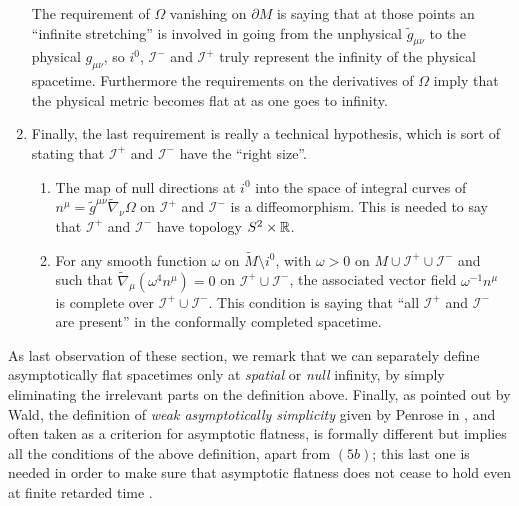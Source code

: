 \begin{definition}
\begin{enumerate}[label=(\arabic*)]
\begin{enumerate}
			\end{enumerate}
			The requirement of \(\Omega\) vanishing on \(\partial M\) is saying that at those points an ``infinite stretching'' is involved in going from the unphysical \(\tilde{g}_{\mu\nu}\) to the physical \(g_{\mu\nu}\), so \(i^0\), \(\mathscr{I}^-\) and \(\mathscr{I}^+\) truly represent the infinity of the physical spacetime. Furthermore the requirements on the derivatives of \(\Omega\) imply that the physical metric becomes flat at as one goes to infinity.
		\item Finally, the last requirement is really a technical hypothesis, which is sort of stating that \(\mathscr{I}^+\) and \(\mathscr{I}^-\) have the ``right size''.
		\begin{enumerate}
			\item The map of null directions at \(i^0\) into the space of integral curves of \(n^{\mu} = \tilde{g}^{\mu\nu} \tilde{\nabla}_{\nu}\Omega\) on  \(\mathscr{I}^+\) and \(\mathscr{I}^-\) is a diffeomorphism. This is needed to say that \(\mathscr{I}^+\) and \(\mathscr{I}^-\) have topology \(S^2\times{\mathbb{R}}\).
			\item For any smooth function \(\omega\) on \(\tilde{M} \setminus i^0\), with \(\omega > 0\) on \(M \cup \mathscr{I}^+ \cup \mathscr{I}^- \) and such that \(\tilde{\nabla}_{\mu}(\omega^4n^{\mu}) = 0\) on \(\mathscr{I}^+ \cup \mathscr{I}^-\), the associated vector field \(\omega^{-1}n^{\mu}\) is complete over \(\mathscr{I}^+ \cup \mathscr{I}^-\). This condition is saying that ``all \(\mathscr{I}^+\) and \(\mathscr{I}^-\) are present'' in the conformally completed spacetime.
			\end{enumerate}
	\end{enumerate}
\end{definition}

As last observation of these section, we remark that we can separately define asymptotically flat spacetimes only at \emph{spatial} or \emph{null} infinity, by simply eliminating the irrelevant parts on the definition above.
Finally, as pointed out by Wald, the definition of \emph{weak asymptotically simplicity} given by Penrose in \cite{penrose1965zero}, and often taken as a criterion for asymptotic flatness, is formally different but implies all the conditions of the above definition, apart from \((5b)\); this last one is needed in order to make sure that asymptotic flatness does not cease to hold even at finite retarded time \cite{geroch1978asymptotically}.

